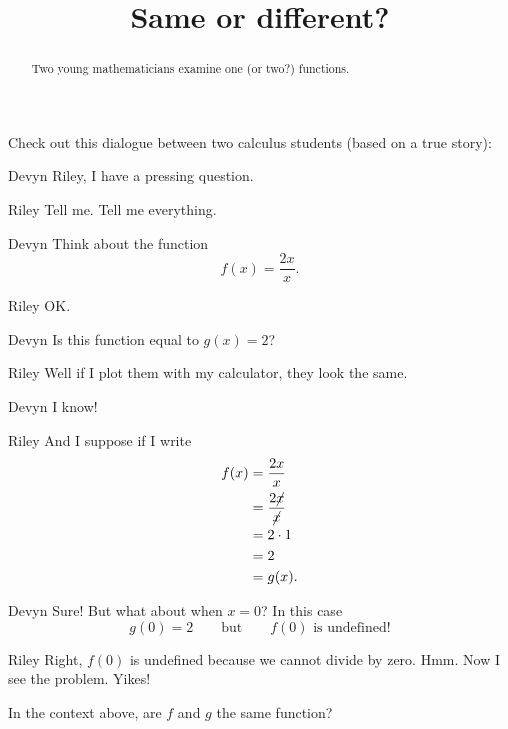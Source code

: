 \documentclass{ximera}
\title[Break-Ground:]{Same or different?}
\begin{document}
\begin{abstract}
  Two young mathematicians examine one (or two?)  functions.
\end{abstract}
\maketitle

Check out this dialogue between two calculus students (based on a true
story):

\begin{dialogue}
\item[Devyn] Riley, I have a pressing question.
\item[Riley] Tell me. Tell me everything.
\item[Devyn] Think about the function
  \[
  f(x) = \frac{2x}{x}.
  \]
\item[Riley] OK.
\item[Devyn] Is this function equal to $g(x) = 2$?
\item[Riley] Well if I plot them with my calculator, they look the
  same.
\item[Devyn] I know!
\item[Riley] And I suppose if I write
  \begin{align*}
    f(x) &= \frac{2x}{x} \\
    &= \frac{2\cancel{x}}{\cancel{x}} \\
    &= 2 \cdot 1 \\
    &= 2 \\
    &= g(x).
  \end{align*}
\item[Devyn] Sure! But what about when $x=0$? In this case
  \[
  g(0) = 2\qquad\text{but}\qquad f(0) \text{ is undefined!}
  \]
\item[Riley] Right, $f(0)$ is undefined because we cannot divide by
  zero. Hmm. Now I see the problem. Yikes!
\end{dialogue}

\begin{problem}
  In the context above, are $f$ and $g$ the same function?
  \begin{multipleChoice}
  \end{multipleChoice}
\end{problem}
\end{document}
